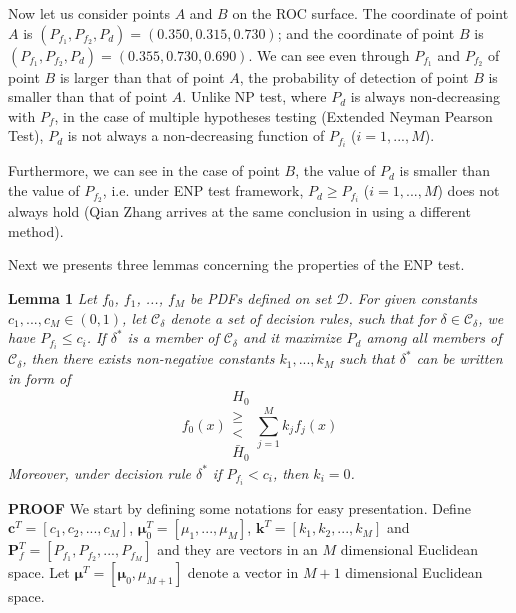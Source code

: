 Now let us consider points $A$ and $B$ on the ROC surface.  The coordinate of point $A$ is $(P_{f_1}, P_{f_2}, P_d) = (0.350, 0.315, 0.730)$; and the coordinate of point $B$ is  $(P_{f_1}, P_{f_2}, P_d) = (0.355, 0.730, 0.690)$. We can see even through $P_{f_1}$ and $P_{f_2}$ of point $B$ is larger than that of point $A$, the probability of detection of point $B$ is  smaller than that of point $A$.  
Unlike NP test, where $P_d$ is always non-decreasing with $P_f$, in the case of multiple hypotheses testing (Extended Neyman Pearson Test), $P_d$ is not always a non-decreasing function of  $P_{f_i}$ ($i=1, ..., M$).

Furthermore, we can see in the case of point $B$, the value of $P_d$ is smaller than the value of $P_{f_2}$, i.e. under ENP test framework, $P_d \geq P_{f_i}$  ($i = 1, ..., M$) does not always hold (Qian Zhang arrives at the same conclusion in  \cite{zhang1999design, zhang2000efficient} using a different method). 

Next we presents three lemmas concerning the properties of the ENP test.

\noindent \textbf{Lemma 1}
\noindent \textit{
Let $f_0$, $f_1$, ..., $f_M$ be PDFs defined on set $\mathcal{D}$. For given constants $c_1, ..., c_M \in (0, 1)$, let $\mathcal{C}_\delta$ denote a set of decision rules,  such that for $\delta \in \mathcal{C}_\delta$, we have $P_{f_i} \leq c_i$.
If  $\delta^{\ast}$ is a member of $\mathcal{C}_\delta$ and it maximize $P_d$ among all members of $\mathcal{C}_\delta$, then there exists non-negative constants $k_1, ..., k_M$ such that $\delta^\ast$ can be written in form of  
\begin{equation}
  \label{2015mar24}
f_0(x) \substack{H_0 \\ \geq \\ < \\ \bar{H}_0} \sum_{j=1}^{M}k_jf_j(x)
\end{equation}
Moreover, under decision rule $\delta^\ast$ if  $P_{f_i} < c_i$, then $k_i = 0$. 
}

\noindent\textbf{PROOF}
\newcommand{\bmu}{\boldsymbol{\mu}}
We start by defining 
 some notations for easy presentation.
Define $\mathbf{c}^T = [c_1, c_2, ..., c_M]$, $\boldsymbol{\mu}_0^T = [\mu_1, ..., \mu_M]$, $\mathbf{k}^T = [k_1, k_2, ..., k_M]$ and  $\mathbf{P}_f^T = [P_{f_1}, P_{f_2}, ..., P_{f_M}]$ and they  are vectors in an $M$ dimensional Euclidean  space. Let $\bmu^T = [\bmu_0, \mu_{M+1}]$ denote a vector in $M+1$ dimensional Euclidean space. 

